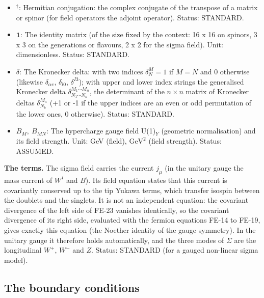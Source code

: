 \documentclass[
  10pt,
]{article}
\begin{document}
\begin{itemize}
  \(D_M,\ D_\mu\): The covariant derivative: on a spinor
  \(D_M = \partial_M + \Omega_M\) (spin connection), on a Standard-Model
  fermion with the gauge fields added; on the sigma field
  \(D_\mu\Sigma\) with the \(W\) and \(B\) fields. Unit: 1/length.
  Status: STANDARD.
\item
  \({}^\dagger\): Hermitian conjugation: the complex conjugate of the
  transpose of a matrix or spinor (for field operators the adjoint
  operator). Status: STANDARD.
\item
  \(\mathbf{1}\): The identity matrix (of the size fixed by the context:
  16 x 16 on spinors, 3 x 3 on the generations or flavours, 2 x 2 for
  the sigma field). Unit: dimensionless. Status: STANDARD.
\item
  \(\delta\): The Kronecker delta: with two indices \(\delta^M_N = 1\)
  if \(M = N\) and 0 otherwise (likewise \(\delta_{\alpha e}\),
  \(\delta_{l0}\), \(\delta^{I3}\)); with upper and lower index strings
  the generalised Kronecker delta
  \(\delta^{M_1\cdots M_n}_{N_1\cdots N_n}\), the determinant of the
  \(n \times n\) matrix of Kronecker deltas \(\delta^{M_a}_{N_b}\) (+1
  or -1 if the upper indices are an even or odd permutation of the lower
  ones, 0 otherwise). Status: STANDARD.
\item
  \(B_M,\ B_{MN}\): The hypercharge gauge field U(1)\(_Y\) (geometric
  normalisation) and its field strength. Unit: GeV (field),
  \(\mathrm{GeV}^{2}\) (field strength). Status: ASSUMED.
\end{itemize}

\textbf{The terms.} The sigma field carries the current \(j_\mu\) (in
the unitary gauge the mass current of \(W^I\) and \(B\)). Its field
equation states that this current is covariantly conserved up to the tip
Yukawa terms, which transfer isospin between the doublets and the
singlets. It is not an independent equation: the covariant divergence of
the left side of FE-23 vanishes identically, so the covariant divergence
of its right side, evaluated with the fermion equations FE-14 to FE-19,
gives exactly this equation (the Noether identity of the gauge
symmetry). In the unitary gauge it therefore holds automatically, and
the three modes of \(\Sigma\) are the longitudinal \(W^+\), \(W^-\) and
\(Z\). Status: STANDARD (for a gauged non-linear sigma model).

\hypertarget{the-boundary-conditions}{%
\subsection{The boundary conditions}\label{the-boundary-conditions}}
\end{document}
